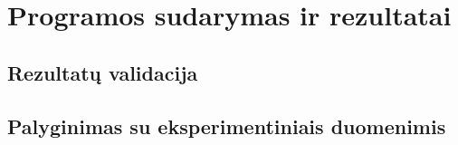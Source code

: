 \section{Programos sudarymas ir rezultatai}
\subsection{Rezultatų validacija}
\subsection{Palyginimas su eksperimentiniais duomenimis}
